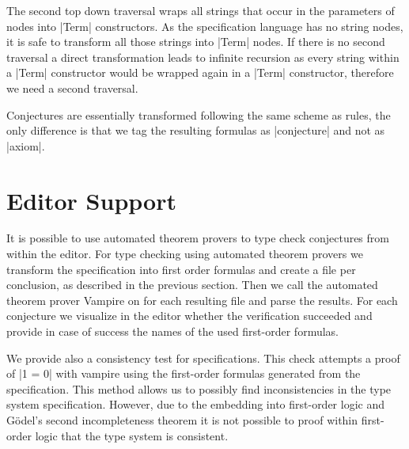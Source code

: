 The second top down traversal wraps all strings that occur in the
parameters of nodes into \code|Term| constructors. As the
specification language has no string nodes, it is safe to transform
all those strings into \code|Term| nodes. If there is no second
traversal a direct transformation leads to infinite recursion as every
string within a \code|Term| constructor would be wrapped again in a
\code|Term| constructor, therefore we need a second traversal.

Conjectures are essentially transformed following the same scheme as
rules, the only difference is that we tag the resulting formulas as
\code|conjecture| and not as \code|axiom|.

\section{Editor Support}
It is possible to use automated theorem provers to type check
conjectures from within the editor. For type checking using automated
theorem provers we transform the specification into first order
formulas and create a file per conclusion, as described in the
previous section. Then we call the automated theorem prover Vampire on
for each resulting file and parse the results. For each conjecture we
visualize in the editor whether the verification succeeded and provide
in case of success the names of the used first-order formulas.

We provide also a consistency test for specifications. This check
attempts a proof of \code|1 = 0| with vampire using the first-order
formulas generated from the specification. This method allows us to
possibly find inconsistencies in the type system
specification. However, due to the embedding into first-order logic
and Gödel's second incompleteness theorem it is not possible to proof
within first-order logic that the type system is consistent.

